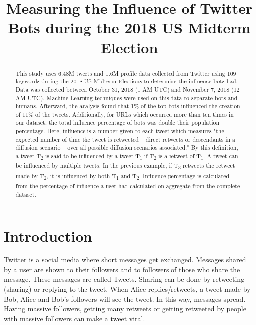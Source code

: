 \documentclass[letterpaper]{article}
\title{Measuring the Influence of Twitter Bots during the 2018 US Midterm Election}
\begin{document}
\maketitle

\begin{abstract}
	This study uses 6.48M tweets and 1.6M profile data collected from Twitter using 109 keywords during the 2018 US Midterm Elections to
    determine the influence bots had. Data was collected between October 31, 2018 (1 AM UTC) and November 7, 2018 (12 AM UTC). 
    Machine Learning techniques were used on this data to separate bots and humans. Afterward, the analysis found that 1\% of the
    top bots influenced the creation of 11\% of the tweets. Additionally, for URLs which occurred
    more than ten times in our dataset, the total influence percentage of bots was double their population percentage. Here, influence is a number given to each tweet which measures 
    "the expected number of time the tweet is retweeted – direct retweets or descendants in a diffusion scenario – over all possible diffusion scenarios  associated." \cite{rizoiu2018debatenight} 
    By this definition, a tweet T\textsubscript{2} is said to be influenced by a tweet T\textsubscript{1} if T\textsubscript{2} is a retweet of T\textsubscript{1}. A tweet can be 
    influenced by multiple tweets. In the previous example, if T\textsubscript{3} retweets the retweet made by T\textsubscript{2}, it is influenced by both T\textsubscript{1} and T\textsubscript{2}.
    Influence percentage is calculated from the percentage of influence a user had calculated on aggregate from the complete dataset.
\end{abstract}

\section{Introduction}
\label{sec:introduction}

Twitter is a social media where short messages get exchanged. Messages shared by a user are shown to
their followers and to followers of those who share the message. These messages are called Tweets. Sharing can be done by retweeting
(sharing) or replying to the tweet. When Alice replies/retweets, a tweet made by Bob, Alice and Bob's followers will see the tweet. In this
way, messages spread. Having massive followers, getting many retweets or getting retweeted by people with massive followers can make a tweet viral.\par
\end{document}
